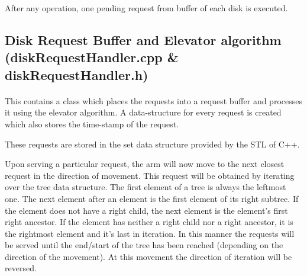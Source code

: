 \documentclass[11pt]{article}
\begin{document}
After any operation, one pending request from buffer of each disk is executed.

\subsection{Disk Request Buffer and Elevator algorithm \\ (diskRequestHandler.cpp \& diskRequestHandler.h)}
\paragraph{}

This contains a class which places the requests into a request buffer and processes it using the elevator algorithm. A data-structure for every request is created which also stores the time-stamp of the request.

These requests are stored in the set data structure provided by the STL of C++.

Upon serving a particular request, the arm will now move to the next closest request in the direction of movement. This request will be obtained by iterating over the tree data structure. The first element of a tree is always the leftmost one. The next element after an element is the first element of its right subtree. If the element does not have a right child, the next element is the element's first right ancestor. If the element has neither a right child nor a right ancestor, it is the rightmost element and it's last in iteration. In this manner the requests will be served until the end/start of the tree has been reached (depending on the direction of the movement). At this movement the direction of iteration will be reversed. 
\end{document}
